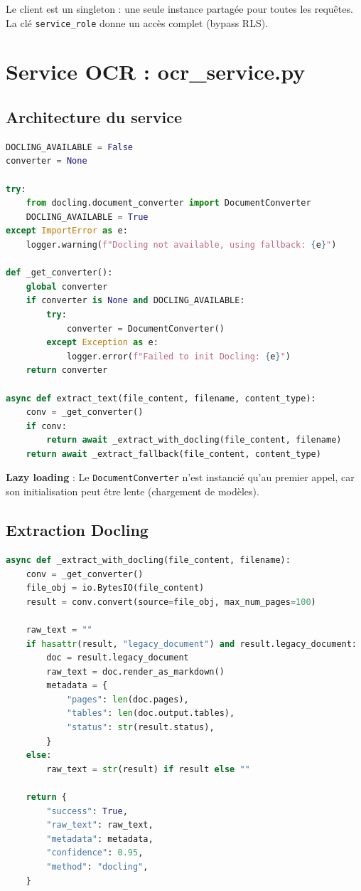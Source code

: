 \documentclass[11pt,a4paper]{report}
\begin{document}
Le client est un singleton : une seule instance partagée pour toutes les requêtes. La clé \texttt{service\_role} donne un accès complet (bypass RLS).

\section{Service OCR : ocr\_service.py}

\subsection{Architecture du service}

\begin{lstlisting}[caption={ocr_service.py — structure}, language=Python]
DOCLING_AVAILABLE = False
converter = None

try:
    from docling.document_converter import DocumentConverter
    DOCLING_AVAILABLE = True
except ImportError as e:
    logger.warning(f"Docling not available, using fallback: {e}")

def _get_converter():
    global converter
    if converter is None and DOCLING_AVAILABLE:
        try:
            converter = DocumentConverter()
        except Exception as e:
            logger.error(f"Failed to init Docling: {e}")
    return converter

async def extract_text(file_content, filename, content_type):
    conv = _get_converter()
    if conv:
        return await _extract_with_docling(file_content, filename)
    return await _extract_fallback(file_content, content_type)
\end{lstlisting}

\textbf{Lazy loading} : Le \texttt{DocumentConverter} n'est instancié qu'au premier appel, car son initialisation peut être lente (chargement de modèles).

\subsection{Extraction Docling}

\begin{lstlisting}[caption={Extraction avec Docling}, language=Python]
async def _extract_with_docling(file_content, filename):
    conv = _get_converter()
    file_obj = io.BytesIO(file_content)
    result = conv.convert(source=file_obj, max_num_pages=100)

    raw_text = ""
    if hasattr(result, "legacy_document") and result.legacy_document:
        doc = result.legacy_document
        raw_text = doc.render_as_markdown()
        metadata = {
            "pages": len(doc.pages),
            "tables": len(doc.output.tables),
            "status": str(result.status),
        }
    else:
        raw_text = str(result) if result else ""

    return {
        "success": True,
        "raw_text": raw_text,
        "metadata": metadata,
        "confidence": 0.95,
        "method": "docling",
    }
\end{lstlisting}
\end{document}
